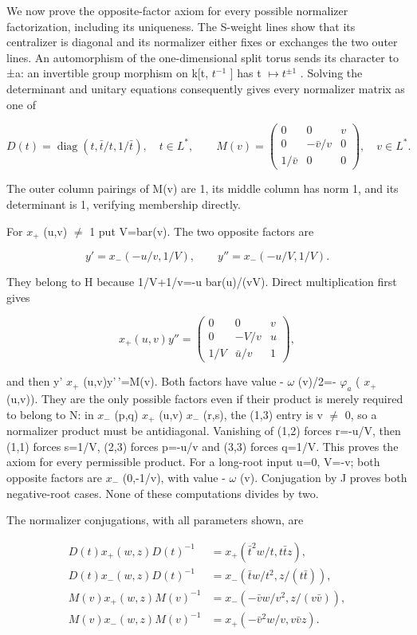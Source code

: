 \documentclass[
  11pt,
]{article}
\begin{document}
We now prove the opposite-factor axiom for every possible normalizer
factorization, including its uniqueness. The S-weight lines show that
its centralizer is diagonal and its normalizer either fixes or exchanges
the two outer lines. An automorphism of the one-dimensional split torus
sends its character to ±a: an invertible group morphism on k{[}t,
\(t^{-1}\) {]} has t \(\mapsto t^{±1}\) . Solving the determinant and
unitary equations consequently gives every normalizer matrix as one of

\[
 D(t)=\operatorname{diag}(t,\bar t/t,1/\bar t),\quad t\in L^*,
 \qquad
 M(v)=\begin{pmatrix}0&0&v\\0&-\bar v/v&0\\1/\bar v&0&0\end{pmatrix},
 \quad v\in L^*.
 \tag{BF.19}
\]

The outer column pairings of M(v) are 1, its middle column has norm 1,
and its determinant is 1, verifying membership directly.

For \(x_{+}\) (u,v) \(\ne\) 1 put V=bar(v). The two opposite factors are

\[
 y'=x_-(-u/v,1/V),\qquad
 y''=x_-(-u/V,1/V).
 \tag{BF.20}
\]

They belong to H because 1/V+1/v=-u bar(u)/(vV). Direct multiplication
first gives

\[
 x_+(u,v)y''=
 \begin{pmatrix}0&0&v\\0&-V/v&u\\1/V&\bar u/v&1\end{pmatrix},
\]

and then y' \(x_{+}\) (u,v)y'\,'=M(v). Both factors have value -
\(\omega\) (v)/2=- \(\varphi_{a}\) ( \(x_{+}\) (u,v)). They are the only
possible factors even if their product is merely required to belong to
N: in \(x_{-}\) (p,q) \(x_{+}\) (u,v) \(x_{-}\) (r,s), the (1,3) entry
is v \(\ne\) 0, so a normalizer product must be antidiagonal. Vanishing
of (1,2) forces r=-u/V, then (1,1) forces s=1/V, (2,3) forces p=-u/v and
(3,3) forces q=1/V. This proves the axiom for every permissible product.
For a long-root input u=0, V=-v; both opposite factors are \(x_{-}\)
(0,-1/v), with value - \(\omega\) (v). Conjugation by J proves both
negative-root cases. None of these computations divides by two.

The normalizer conjugations, with all parameters shown, are

\[
 \begin{aligned}
 D(t)x_+(w,z)D(t)^{-1}
   &=x_+(\bar t^2w/t,t\bar t z),\\
 D(t)x_-(w,z)D(t)^{-1}
   &=x_-(\bar t w/t^2,z/(t\bar t)),\\
 M(v)x_+(w,z)M(v)^{-1}
   &=x_-(-\bar v w/v^2,z/(v\bar v)),\\
 M(v)x_-(w,z)M(v)^{-1}
   &=x_+(-\bar v^2w/v,v\bar v z).
 \end{aligned}
 \tag{BF.21}
\]
\end{document}
